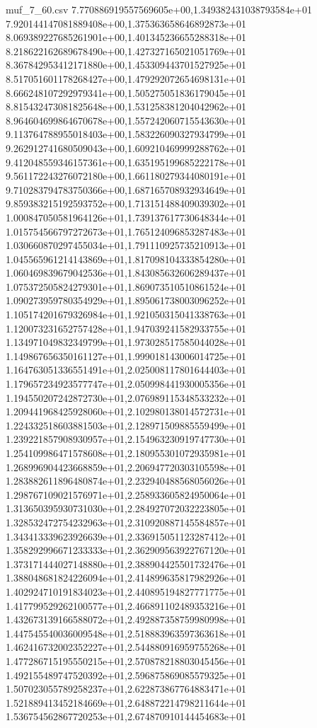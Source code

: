 \begin{filecontents*}{muf_7_60.csv}
7.770886919557569605e+00,1.349382431038793584e+01
7.920144147081889408e+00,1.375363658646892873e+01
8.069389227685261901e+00,1.401345236655288318e+01
8.218622162689678490e+00,1.427327165021051769e+01
8.367842953412171880e+00,1.453309443701527925e+01
8.517051601178268427e+00,1.479292072654698131e+01
8.666248107292979341e+00,1.505275051836179045e+01
8.815432473081825648e+00,1.531258381204042962e+01
8.964604699864670678e+00,1.557242060715543630e+01
9.113764788955018403e+00,1.583226090327934799e+01
9.262912741680509043e+00,1.609210469999288762e+01
9.412048559346157361e+00,1.635195199685222178e+01
9.561172243276072180e+00,1.661180279344080191e+01
9.710283794783750366e+00,1.687165708932934649e+01
9.859383215192593752e+00,1.713151488409039302e+01
1.000847050581964126e+01,1.739137617730648344e+01
1.015754566797272673e+01,1.765124096853287483e+01
1.030660870297455034e+01,1.791110925735210913e+01
1.045565961214143869e+01,1.817098104333854280e+01
1.060469839679042536e+01,1.843085632606289437e+01
1.075372505824279301e+01,1.869073510510861524e+01
1.090273959780354929e+01,1.895061738003096252e+01
1.105174201679326984e+01,1.921050315041338763e+01
1.120073231652757428e+01,1.947039241582933755e+01
1.134971049832349799e+01,1.973028517585044028e+01
1.149867656350161127e+01,1.999018143006014725e+01
1.164763051336551491e+01,2.025008117801644403e+01
1.179657234923577747e+01,2.050998441930005356e+01
1.194550207242872730e+01,2.076989115348533232e+01
1.209441968425928060e+01,2.102980138014572731e+01
1.224332518603881503e+01,2.128971509885559499e+01
1.239221857908930957e+01,2.154963230919747730e+01
1.254109986471578608e+01,2.180955301072935981e+01
1.268996904423668859e+01,2.206947720303105598e+01
1.283882611896480874e+01,2.232940488568056026e+01
1.298767109021576971e+01,2.258933605824950064e+01
1.313650395930731030e+01,2.284927072032223805e+01
1.328532472754232963e+01,2.310920887145584857e+01
1.343413339623926639e+01,2.336915051123287412e+01
1.358292996671233333e+01,2.362909563922767120e+01
1.373171444027148880e+01,2.388904425501732476e+01
1.388048681824226094e+01,2.414899635817982926e+01
1.402924710191834023e+01,2.440895194827771775e+01
1.417799529262100577e+01,2.466891102489353216e+01
1.432673139166588072e+01,2.492887358759980998e+01
1.447545540036009548e+01,2.518883963597363618e+01
1.462416732002352227e+01,2.544880916959755268e+01
1.477286715195550215e+01,2.570878218803045456e+01
1.492155489747520392e+01,2.596875869085579325e+01
1.507023055789258237e+01,2.622873867764883471e+01
1.521889413452184669e+01,2.648872214798211644e+01
1.536754562867720253e+01,2.674870910144454683e+01

\end{filecontents*}
